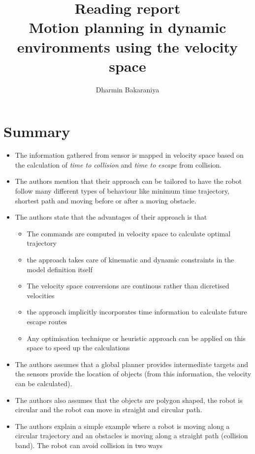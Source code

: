 \documentclass[12pt]{article}
\title{Reading report\\Motion planning in dynamic environments using the velocity space\cite{owen2005motion}}
\author{Dharmin Bakaraniya}
\begin{document}
\maketitle{}

\begin{abstract}
\end{abstract}

\section{Summary}
\begin{itemize}
    \item The information gathered from sensor is mapped in velocity space based on the calculation of \textit{time to collision} and \textit{time to escape} from collision.
    \item The authors mention that their approach can be tailored to have the robot follow many different types of behaviour like minimum time trajectory, shortest path and  moving before or after a moving obstacle.
    \item The authors state that the advantages of their approach is that
    \begin{itemize}
        \item The commands are computed in velocity space to calculate optimal trajectory
        \item the approach takes care of kinematic and dynamic constraints in the model definition itself
        \item The velocity space conversions are continous rather than dicretised velocities
        \item the approach implicitly incorporates time information to calculate future escape routes
        \item Any optimisation technique or heuristic approach can be applied on this space to speed up the calculations
    \end{itemize}
    \item The authors assumes that a global planner provides intermediate targets and the sensors provide the location of objects (from this information, the velocity can be calculated).
    \item The authors also assumes that the objects are polygon shaped, the robot is circular and the robot can move in straight and circular path.
    \item The authors explain a simple example where a robot is moving along a circular trajectory and an obstacles is moving along a straight path (collision band). The robot can avoid collision in two ways

\end{itemize}
\end{document}
